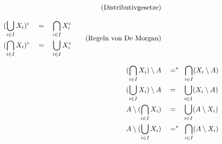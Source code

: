 \begin{align*}
\begin{split}
    \end{split} \tag{Distributivgesetze} \\[0.8em]
    \begin{split}
    (\bigcup_{i\in I} X_i)^c & \quad =\quad \smashoperator[l]{\bigcap_{i\in I}} X_i^c \\
    (\bigcap_{i\in I} X_i)^c & \quad =\quad \smashoperator[l]{\bigcup_{i\in I}} X_i^c
    \end{split} \tag{Regeln von De Morgan} \\[0.8em]
    (\bigcap_{i\in I} X_i) \setminus A & \quad =^* \quad\hspace{-.4em} \smashoperator[l]{\bigcap_{i\in I}} (X_i \setminus A)  \\
    (\bigcup_{i\in I} X_i) \setminus A & \quad =\quad \smashoperator[l]{\bigcup_{i\in I}} (X_i \setminus A) \\
    A \setminus (\bigcap_{i\in I} X_i) & \quad =\quad \smashoperator[l]{\bigcup_{i\in I}} (A \setminus X_i) \\
    A \setminus (\bigcup_{i\in I} X_i) & \quad =^* \quad\hspace{-.4em} \smashoperator[l]{\bigcap_{i\in I}} (A \setminus X_i)
\end{align*}
\endgroup





